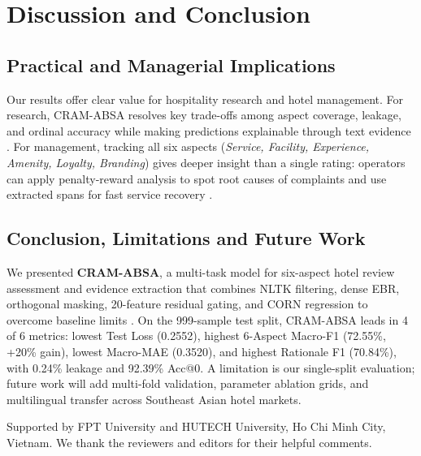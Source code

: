 \documentclass[pdflatex,sn-mathphys-num]{sn-jnl}%
\theoremstyle{thmstyleone}%
\theoremstyle{thmstyletwo}%
\theoremstyle{thmstylethree}%
\begin{document}
\section{Discussion and Conclusion}
\label{sec:discussion_conclusion}

\subsection{Practical and Managerial Implications}
\label{subsec:discussion_implications}
Our results offer clear value for hospitality research and hotel management. For research, CRAM-ABSA resolves key trade-offs among aspect coverage, leakage, and ordinal accuracy while making predictions explainable through text evidence \cite{ref16_shin2024}. For management, tracking all six aspects (\textit{Service, Facility, Experience, Amenity, Loyalty, Branding}) gives deeper insight than a single rating: operators can apply penalty-reward analysis \cite{ref13_zhang2022} to spot root causes of complaints and use extracted spans for fast service recovery \cite{ref15_pang2025}.

\subsection{Conclusion, Limitations and Future Work}
\label{subsec:conclusion_future_work}
We presented \textbf{CRAM-ABSA}, a multi-task model for six-aspect hotel review assessment and evidence extraction that combines NLTK filtering, dense EBR, orthogonal masking, 20-feature residual gating, and CORN regression to overcome baseline limits \cite{ref01_bimaputra2023,ref04_namee2023,ref09_nadeem2025}. On the 999-sample test split, CRAM-ABSA leads in 4 of 6 metrics: lowest Test Loss (0.2552), highest 6-Aspect Macro-F1 (72.55\%, +20\% gain), lowest Macro-MAE (0.3520), and highest Rationale F1 (70.84\%), with 0.24\% leakage and 92.39\% Acc@0. A limitation is our single-split evaluation; future work will add multi-fold validation, parameter ablation grids, and multilingual transfer across Southeast Asian hotel markets.

\backmatter

Supported by FPT University and HUTECH University, Ho Chi Minh City, Vietnam. We thank the reviewers and editors for their helpful comments.
\end{document}
